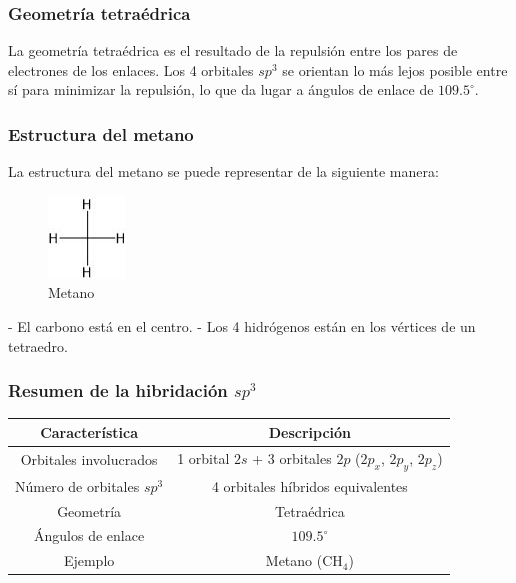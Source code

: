 \documentclass{article}
\begin{document}
\subsubsection{Geometría tetraédrica}
La geometría tetraédrica es el resultado de la repulsión entre los pares de electrones de los enlaces. Los 4 orbitales \( sp^3 \) se orientan lo más lejos posible entre sí para minimizar la repulsión, lo que da lugar a ángulos de enlace de \( 109.5^\circ \).

\subsubsection{Estructura del metano}
La estructura del metano se puede representar de la siguiente manera:

\begin{figure}
    \centering
    \includegraphics[width=0.5\linewidth]{media/metano.jpg}
    \caption{Metano}
    \label{fig:metano}
\end{figure}

- El carbono está en el centro.
- Los 4 hidrógenos están en los vértices de un tetraedro.

\subsubsection{Resumen de la hibridación \( sp^3 \)}
\begin{table}[h!]
\centering
\begin{tabular}{|c|c|}
\hline
\textbf{Característica} & \textbf{Descripción} \\
\hline
Orbitales involucrados & 1 orbital \( 2s \) + 3 orbitales \( 2p \) (\( 2p_x \), \( 2p_y \), \( 2p_z \)) \\
\hline
Número de orbitales \( sp^3 \) & 4 orbitales híbridos equivalentes \\
\hline
Geometría & Tetraédrica \\
\hline
Ángulos de enlace & \( 109.5^\circ \) \\
\hline
Ejemplo & Metano (\( \text{CH}_4 \)) \\
\hline
\end{tabular}
\end{table}
\end{document}
